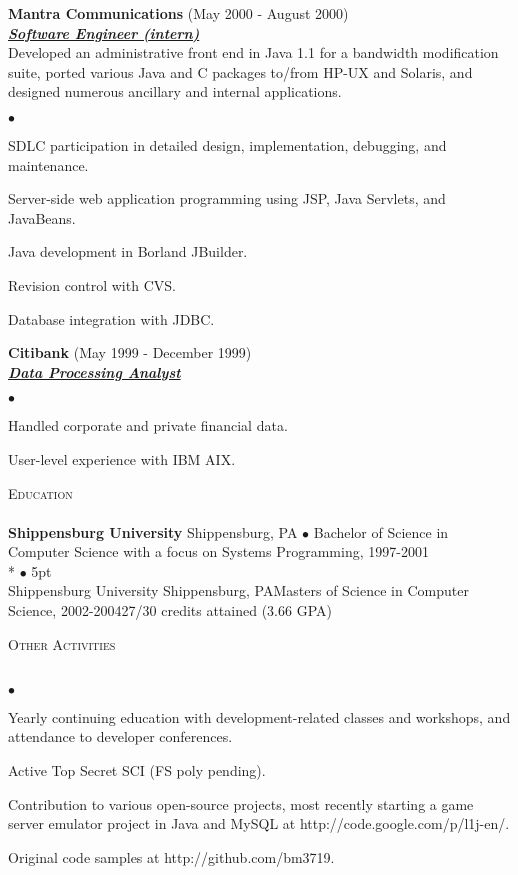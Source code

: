 \documentclass{article}
\newcommand{\lineunder}{\vspace*{-8pt} \\ \hspace*{-18pt} \hrulefill \\}
\newcommand{\header}[1]{{\hspace*{-15pt}\vspace*{7pt} \textsc{#1}} \vspace*{-7pt} \lineunder}
\newcommand{\employer}[3]{{ \textbf{#1} (#2)\\ \underline{\textbf{\emph{#3}}}\\  }}
\newenvironment{achievements}{\begin{list}{$\bullet$}{\topsep 0pt \itemsep
      -2pt}}{\vspace*{4pt}\end{list}}
\newcommand{\schoolwithcourses}[4]{
\textbf{#1} #2 $\bullet$ #3\\ 
#4 
\vspace*{5pt}
}
\begin{document}
\employer{Mantra Communications}{May 2000 - August 2000}{Software Engineer
  (intern)} Developed an administrative front end in Java 1.1 for a bandwidth
modification suite, ported various Java and C packages to/from HP-UX and
Solaris, and designed numerous ancillary and internal applications.
\begin{achievements}
\item SDLC participation in detailed design, implementation, debugging, and
  maintenance.
\item Server-side web application programming using JSP, Java Servlets, and
  JavaBeans.
\item Java development in Borland JBuilder.
\item Revision control with CVS.
\item Database integration with JDBC.
\end{achievements}

\employer{Citibank}{May 1999 - December 1999}{Data Processing Analyst}
\begin{achievements}
\item Handled corporate and private financial data.
\item User-level experience with IBM AIX.
\end{achievements}

\header{Education}

\schoolwithcourses{Shippensburg University}{Shippensburg, PA}{Bachelor of
  Science in Computer Science with a focus on Systems Programming, 1997-2001}

\schoolwithcourses{Shippensburg University}{Shippensburg, PA}{Masters of
  Science in Computer Science, 2002-2004}{27/30 credits attained (3.66 GPA)}

\header{Other Activities}
\begin{achievements}
\item Yearly continuing education with development-related classes and
  workshops, and attendance to developer conferences.
\item Active Top Secret SCI (FS poly pending).
\item Contribution to various open-source projects, most recently starting a
  game server emulator project in Java and MySQL at
  http://code.google.com/p/l1j-en/.
\item Original code samples at http://github.com/bm3719.
\end{achievements}
\end{document}
